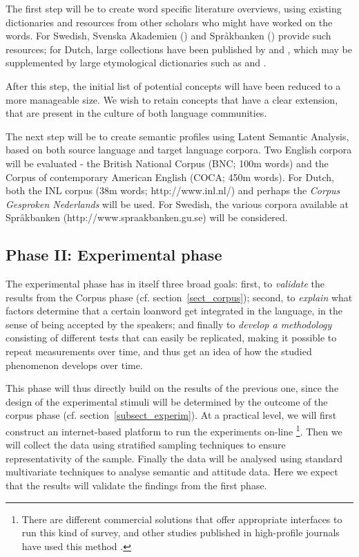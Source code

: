 \documentclass[a4paper]{article}
\begin{document}
The first step will be to create word specific literature overviews, using existing dictionaries and resources from other scholars who might have worked on the words. For Swedish, Svenska Akademien (\citet{Akademien2012}) and Spr\aa kbanken (\citet{Universitet2012}) provide such resources; for Dutch, large collections have been published by \cite{Koops2009} and \cite{Braamkolk2005}, which may be supplemented by large etymological dictionaries such as \citet{Sijs2001} and \citet{Sijs2005}.

After this step, the initial list of potential concepts will have been reduced to a more manageable size. We wish to retain concepts that have a clear extension, that are present in the culture of both language communities.

The next step will be to create semantic profiles using Latent Semantic Analysis, based on both source language and target language corpora. 
Two English corpora will be evaluated - the British National Corpus (BNC; 100m words) and the Corpus of contemporary American English (COCA; 450m words). 
For Dutch, both the INL corpus (38m words; http://www.inl.nl/) and perhaps the \textit{Corpus Gesproken Nederlands} \citep[Corpus of Spoken Dutch; 10m words;][]{Oostdijk2003} will be used. 
For Swedish, the various corpora available at Spr\aa kbanken (http://www.spraakbanken.gu.se) will be considered.


\subsection{Phase II: Experimental phase}

The experimental phase has in itself three broad goals:
first, to \emph{validate} the results from the Corpus phase (cf. section~\ref{sect_corpus});
second, to \emph{explain} what factors determine that a certain loanword get integrated in the language, in the sense of being accepted by the speakers;
and finally to \emph{develop a methodology} consisting of different tests that can easily be replicated, making it possible to repeat measurements over time, and thus get an idea of how the studied phenomenon develops over time.

This phase will thus directly build on the results of the previous one, since the design of the experimental stimuli will be determined by the outcome of the corpus phase (cf. section~\ref{subsect_experim}).
At a practical level, we will first construct an internet-based platform to run the experiments on-line%
\footnote{There are different commercial solutions that offer appropriate interfaces to run this kind of survey, and other studies published in high-profile journals have used this method \citep[e.g.][]{Scontras2012}.}.
Then we will collect the data using stratified sampling techniques to ensure representativity of the sample.
Finally the data will be analysed using standard multivariate techniques to analyse semantic and attitude data.
Here we expect that the results will validate the findings from the first phase.
\end{document}
